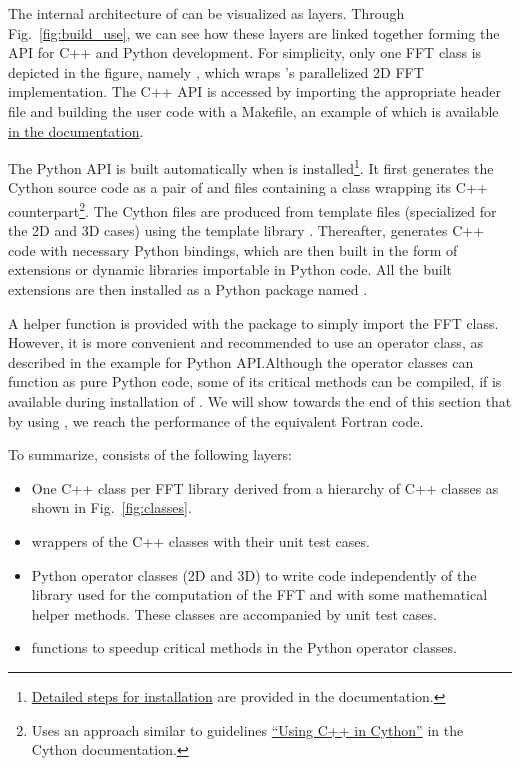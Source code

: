 The internal architecture of  can be visualized as layers.  Through
Fig.~\ref{fig:build_use}, we can see how these layers are linked together forming
the API for C++ and Python development. For simplicity, only one FFT class is
depicted in the figure, namely , which wraps
's parallelized 2D FFT implementation. The C++ API is accessed by
importing the appropriate header file and building the user code with a Makefile,
an example of which is available \href{%
https://fluidfft.readthedocs.io/en/latest/examples/cpp.html}{%
in the documentation}.

The Python API is built automatically when  is
installed\footnote{%
\href{https://fluidfft.readthedocs.io/en/latest/install.html}{Detailed steps
for installation} are provided in the documentation.}.
%
It first generates the Cython source code as a pair of  and
 files containing a class wrapping its C++
counterpart\footnote{Uses an approach similar to guidelines \href{%
    https://cython.readthedocs.io/en/latest/src/userguide/wrapping_CPlusPlus.html}{%
``Using C++ in Cython''} in the Cython documentation.}.
%
The Cython files are produced from template files (specialized for the 2D and
3D cases) using the template library \mako.
%
Thereafter,  \citep{behnel_cython2011} generates C++ code with
necessary Python bindings, which are then built in the form of extensions or
dynamic libraries importable in Python code. All the built extensions are then
installed as a Python package named .

A helper function  is provided with the
package to simply import the FFT class. However, it is more convenient and
recommended to use an operator class, as described in the example for Python
API.\@ Although the operator classes can function as pure Python code, some of
its critical methods can be compiled, if 
\citep{guelton2018pythran} is available during installation of
. We will show towards the end of this section that by using
, we reach the performance of the equivalent Fortran code.

To summarize,  consists of the following layers:
\begin{itemize}

\item One C++ class per FFT library derived from a hierarchy of C++ classes
as shown in Fig.~\ref{fig:classes}.

\item {} wrappers of the C++ classes with their unit test cases.

\item Python operator classes (2D and 3D) to write code independently of the
library used for the computation of the FFT and with some mathematical helper
methods. These classes are accompanied by unit test cases.

\item {} functions to speedup critical methods in the Python
operator classes.

\end{itemize}

